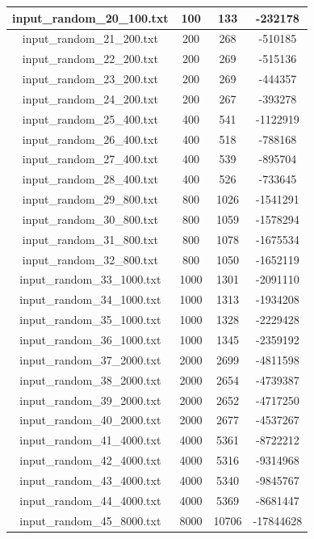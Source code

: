 \begin{longtable}{|c|c|c|c|}
		input\_random\_20\_100.txt & 100 & 133 & -232178 \\ \hline
		input\_random\_21\_200.txt & 200 & 268 & -510185 \\ \hline
		input\_random\_22\_200.txt & 200 & 269 & -515136 \\ \hline
		input\_random\_23\_200.txt & 200 & 269 & -444357 \\ \hline
		input\_random\_24\_200.txt & 200 & 267 & -393278 \\ \hline
		input\_random\_25\_400.txt & 400 & 541 & -1122919 \\ \hline
		input\_random\_26\_400.txt & 400 & 518 & -788168 \\ \hline
		input\_random\_27\_400.txt & 400 & 539 & -895704 \\ \hline
		input\_random\_28\_400.txt & 400 & 526 & -733645 \\ \hline
		input\_random\_29\_800.txt & 800 & 1026 & -1541291 \\ \hline
		input\_random\_30\_800.txt & 800 & 1059 & -1578294 \\ \hline
		input\_random\_31\_800.txt & 800 & 1078 & -1675534 \\ \hline
		input\_random\_32\_800.txt & 800 & 1050 & -1652119 \\ \hline
		input\_random\_33\_1000.txt & 1000 & 1301 & -2091110 \\ \hline
		input\_random\_34\_1000.txt & 1000 & 1313 & -1934208 \\ \hline
		input\_random\_35\_1000.txt & 1000 & 1328 & -2229428 \\ \hline
		input\_random\_36\_1000.txt & 1000 & 1345 & -2359192 \\ \hline
		input\_random\_37\_2000.txt & 2000 & 2699 & -4811598 \\ \hline
		input\_random\_38\_2000.txt & 2000 & 2654 & -4739387 \\ \hline
		input\_random\_39\_2000.txt & 2000 & 2652 & -4717250 \\ \hline
		input\_random\_40\_2000.txt & 2000 & 2677 & -4537267 \\ \hline
		input\_random\_41\_4000.txt & 4000 & 5361 & -8722212 \\ \hline
		input\_random\_42\_4000.txt & 4000 & 5316 & -9314968 \\ \hline
		input\_random\_43\_4000.txt & 4000 & 5340 & -9845767 \\ \hline
		input\_random\_44\_4000.txt & 4000 & 5369 & -8681447 \\ \hline
		input\_random\_45\_8000.txt & 8000 & 10706 & -17844628 \\ \hline

\end{longtable}
